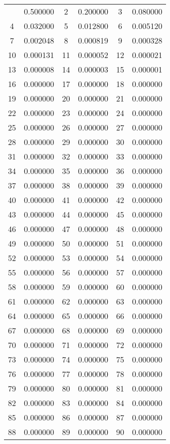 \documentclass[12pt]{article}
\begin{document}
\begin{longtable}{@{}cc|cc|cc@{}}
\bottomrule
\endlastfoot
1 & 0.500000 & 2 & 0.200000 & 3 & 0.080000 \\
4 & 0.032000 & 5 & 0.012800 & 6 & 0.005120 \\
7 & 0.002048 & 8 & 0.000819 & 9 & 0.000328 \\
10 & 0.000131 & 11 & 0.000052 & 12 & 0.000021 \\
13 & 0.000008 & 14 & 0.000003 & 15 & 0.000001 \\
16 & 0.000000 & 17 & 0.000000 & 18 & 0.000000 \\
19 & 0.000000 & 20 & 0.000000 & 21 & 0.000000 \\
22 & 0.000000 & 23 & 0.000000 & 24 & 0.000000 \\
25 & 0.000000 & 26 & 0.000000 & 27 & 0.000000 \\
28 & 0.000000 & 29 & 0.000000 & 30 & 0.000000 \\
31 & 0.000000 & 32 & 0.000000 & 33 & 0.000000 \\
34 & 0.000000 & 35 & 0.000000 & 36 & 0.000000 \\
37 & 0.000000 & 38 & 0.000000 & 39 & 0.000000 \\
40 & 0.000000 & 41 & 0.000000 & 42 & 0.000000 \\
43 & 0.000000 & 44 & 0.000000 & 45 & 0.000000 \\
46 & 0.000000 & 47 & 0.000000 & 48 & 0.000000 \\
49 & 0.000000 & 50 & 0.000000 & 51 & 0.000000 \\
52 & 0.000000 & 53 & 0.000000 & 54 & 0.000000 \\
55 & 0.000000 & 56 & 0.000000 & 57 & 0.000000 \\
58 & 0.000000 & 59 & 0.000000 & 60 & 0.000000 \\
61 & 0.000000 & 62 & 0.000000 & 63 & 0.000000 \\
64 & 0.000000 & 65 & 0.000000 & 66 & 0.000000 \\
67 & 0.000000 & 68 & 0.000000 & 69 & 0.000000 \\
70 & 0.000000 & 71 & 0.000000 & 72 & 0.000000 \\
73 & 0.000000 & 74 & 0.000000 & 75 & 0.000000 \\
76 & 0.000000 & 77 & 0.000000 & 78 & 0.000000 \\
79 & 0.000000 & 80 & 0.000000 & 81 & 0.000000 \\
82 & 0.000000 & 83 & 0.000000 & 84 & 0.000000 \\
85 & 0.000000 & 86 & 0.000000 & 87 & 0.000000 \\
88 & 0.000000 & 89 & 0.000000 & 90 & 0.000000 \\

\end{longtable}
\end{document}

